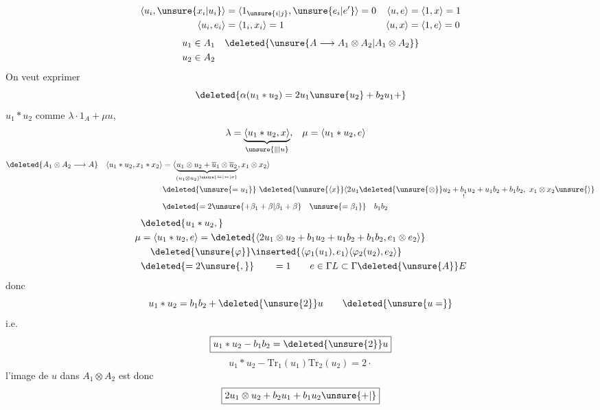 \[
\begin{aligned}
\langle u_i,\unsure{x_i|u_i}\rangle&=\langle1_{\unsure{i|j}},\unsure{e_i|e'}\rangle=0&
 \langle u,e\rangle&=\langle1,x\rangle=1\\
\langle u_i,e_i\rangle&=\langle1_i,x_i\rangle=1&
 \langle u,x\rangle&=\langle1,e\rangle=0
\end{aligned}
\]
\[
\begin{aligned}
u_1&\in A_1&\deleted{\unsure{A\longrightarrow A_1\otimes A_2|A_1\otimes A_2}}\\
u_2&\in A_2&
\end{aligned}
\]
On veut exprimer
\[
\deleted{\alpha(u_1\ast u_2)=2u_1\unsure{u_2}+b_2u_1+}
\]
$u_1\ast u_2$ comme $\lambda\cdot1_A+\mu u$,  
\[
\begin{aligned}
\lambda&=\underbrace{\langle u_1\ast u_2,x\rangle}_{\unsure{\Vert|u}} ,
 &\mu&=\langle u_1\ast u_2,e\rangle
\end{aligned}
\]
\[
\begin{aligned}
\deleted{A_1\otimes A_2\longrightarrow A}\quad
\langle u_1\ast u_2,x_1\ast x_2\rangle
 &=\langle\underbrace{u_1\otimes u_2+\overline u_1\otimes\overline u_2}_{(u_1\otimes u_2)^{\unsure{\leftrightarrows|\leftrightarrow|\sigma}}},x_1\otimes x_2\rangle\\
 &\deleted{\unsure{=u_1}}\ \deleted{\unsure{\langle x}}\langle 2u_1\deleted{\unsure{\otimes}}u_2+
 \underset{!}{b_1}u_2+u_1b_2+b_1b_2,\ x_1\otimes x_2\unsure{\rangle}\\
 &\deleted{=2\unsure{+\beta_1+\beta|\beta_1+\beta}\quad\unsure{=\beta_1}}\quad b_1b_2
\end{aligned}
\]
\[
\begin{aligned}
&\deleted{u_1\ast u_2,}\\
\mu&=\langle u_1\ast u_2,e\rangle
 =\deleted{\langle 2u_1\otimes u_2+b_1u_2+u_1b_2+b_1b_2,e_1\otimes e_2\rangle}\\
&\quad \deleted{\unsure{\varphi}}\inserted{\langle\varphi_1(u_1),e_1\rangle
 \langle\varphi_2(u_2),e_2\rangle}\\
&\deleted{=2\unsure{,}}\qquad=1\qquad e\in\Gamma L\subset\Gamma\deleted{\unsure{A}}E
\end{aligned}
\]
donc
\[
u_1\ast u_2=b_1b_2+\deleted{\unsure{2}}u
\qquad\deleted{\unsure{u=}}
\]
i.e.
\[
\boxed{u_1\ast u_2-b_1b_2=\deleted{\unsure{2}}u}
\]
\[
u_1\ast u_2-\mathrm{Tr}_1(u_1)\mathrm{Tr}_2(u_2)=2\cdot
\]
l'image de $u$ dans $A_1\otimes A_2$ est donc
\[
\boxed{2u_1\otimes u_2+b_2u_1+b_1u_2\unsure{+|{}}}
\]
